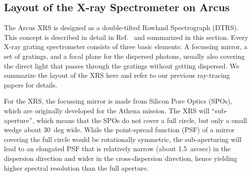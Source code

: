 \documentclass[12pt]{spieman}  %
\begin{document}
\begin{spacing}{2}
\section{Layout of the X-ray Spectrometer on Arcus}
\label{sect:layout}
The Arcus XRS is designed as a double-tilted Rowland Spectrograph (DTRS). This concept is described in detail in Ref.~ and summarized in this section. Every X-ray grating spectrometer consists of three basic elements: A focussing mirror, a set of gratings, and a focal plane for the dispersed photons, usually also covering the direct light that passes through the gratings without getting dispersed. We summarize the layout of the XRS here and refer to our previous ray-tracing papers for details\cite{10.1117/12.2273011,10.1117/12.2312678,DTRS}.


For the XRS, the focussing mirror is made from Silicon Pore Optics (SPOs), which are originally developed for the Athena mission\cite{10.1117/12.2188988,10.1117/12.2599339,10.1117/12.2677388}. The XRS will ``sub-aperture'', which means that the SPOs do not cover a full circle, but only a small wedge about 30~deg wide. While the point-spread function (PSF) of a mirror covering the full circle would be rotationally symmetric, the sub-aperturing will lead to an elongated PSF that is relatively narrow (about 1.5~arcsec) in the dispersion direction and wider in the cross-dispersion direction\cite{1987ApOpt..26.2915C,2010SPIE.7732E..1JH,DTRS}, hence yielding higher spectral resolution than the full aperture.


\end{spacing}
\end{document}
